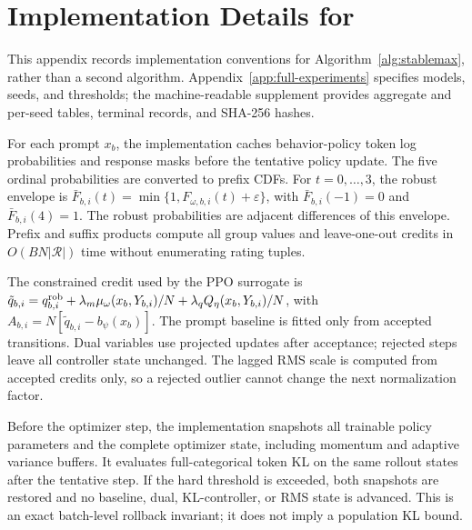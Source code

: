 \clearpage
\section{Implementation Details for \method}
\label{app:algorithm}

This appendix records implementation conventions for Algorithm~\ref{alg:stablemax},
rather than a second algorithm. Appendix~\ref{app:full-experiments} specifies
models, seeds, and thresholds; the machine-readable supplement provides
aggregate and per-seed tables, terminal records, and SHA-256 hashes.

For each prompt $x_b$, the implementation caches behavior-policy token log
probabilities and response masks before the tentative policy update. The five
ordinal probabilities are converted to prefix CDFs. For
$t=0,\ldots,3$, the robust envelope is
\(\bar F_{b,i}(t)=\min\{1,F_{\omega,b,i}(t)+\varepsilon\}\),
with \(\bar F_{b,i}(-1)=0\) and \(\bar F_{b,i}(4)=1\).
The robust probabilities are adjacent differences of this envelope. Prefix
and suffix products compute all group values and leave-one-out credits in
$O(BN|\mathcal R|)$ time without enumerating rating tuples.

The constrained credit used by the PPO surrogate is
\(\tilde q_{b,i}=q^{\rm rob}_{b,i}+\lambda_m\mu_\omega(x_b,Y_{b,i})/N+
\lambda_qQ_\eta(x_b,Y_{b,i})/N\), with
\(A_{b,i}=N[\tilde q_{b,i}-b_\psi(x_b)]\).
The prompt baseline is fitted only from accepted transitions. Dual variables
use projected updates after acceptance; rejected steps leave all controller
state unchanged. The lagged RMS scale is computed from accepted credits only,
so a rejected outlier cannot change the next normalization factor.

Before the optimizer step, the implementation snapshots all trainable policy
parameters and the complete optimizer state, including momentum and adaptive
variance buffers. It evaluates full-categorical token KL on the same rollout
states after the tentative step. If the hard threshold is exceeded, both
snapshots are restored and no baseline, dual, KL-controller, or RMS state is
advanced. This is an exact batch-level rollback invariant; it does not imply
a population KL bound.

